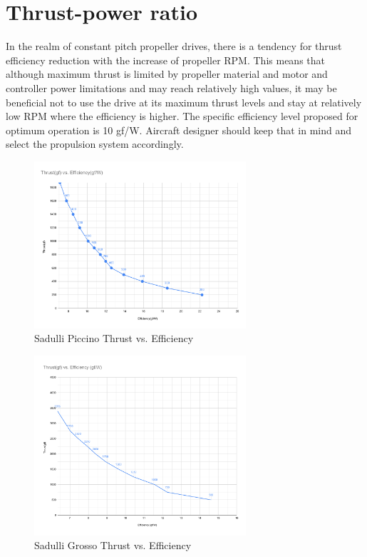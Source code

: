 \newpage

\section{Thrust-power ratio}

In the realm of constant pitch propeller drives, there is a tendency for thrust efficiency reduction 
with the increase of propeller RPM. This means that although maximum thrust is limited by propeller material 
and motor and controller power limitations and may reach relatively high values,  
it may be beneficial not to use the drive at its maximum thrust levels and stay at relatively low RPM 
where the efficiency is higher. The specific efficiency level proposed for optimum operation is 10 gf/W. 
Aircraft designer should keep that in mind and select the propulsion system accordingly.

\begin{figure}[!hbt]
    \centerline{\includegraphics[width=0.7\textwidth]{figures/thrust-efficiency_piccino.pdf}}
    \caption{Sadulli Piccino Thrust vs. Efficiency\label{Piccino_thrust_vs_efficiency}}
\end{figure}

\begin{figure}[!hbt]
    \centerline{\includegraphics[width=0.7\textwidth]{figures/thrust-efficiency_grosso.pdf}}
    \caption{Sadulli Grosso Thrust vs. Efficiency\label{Grosso_thrust_vs_efficiency}}
\end{figure}
